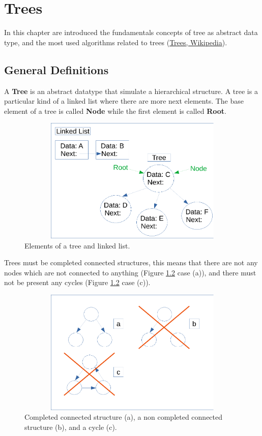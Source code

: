\setchapterpreamble[u]{\margintoc}
\chapter{Trees}
In this chapter are introduced the fundamentals concepts of tree as abstract data type, and the most used algorithms related to trees \cite{wikitrees} (\href{https://en.wikipedia.org/wiki/Tree_(data_structure)}{Trees, Wikipedia}).

\section{General Definitions}
A \textbf{Tree} is an abstract datatype that simulate a hierarchical structure. A tree is a particular kind of a linked list where there are more next elements. The base element of a tree is called \textbf{Node} while the first element is called \textbf{Root}.

\begin{figure}[hb]
	\includegraphics[width=14cm,height=6cm]{chapters/trees/images/trees_1.pdf}
	\caption[]{Elements of a tree and linked list.}
	\label{trees_1}
\end{figure}

Trees must be completed connected structures, this means that there are not any nodes which are not connected to anything (Figure \ref{trees_2} case (a)), and there must not be present any cycles (Figure \ref{trees_2} case (c)).

\begin{figure}[hb]
	\includegraphics[width=14cm,height=6cm]{chapters/trees/images/trees_2.pdf}
	\caption[]{Completed connected structure (a), a non completed connected structure (b), and a cycle (c).}
	\label{trees_2}
\end{figure}


